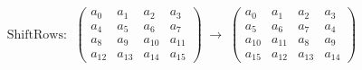\[
\text{ShiftRows: }\;
\begin{pmatrix}
a_0 & a_1 & a_2 & a_3 \\
a_4 & a_5 & a_6 & a_7 \\
a_8 & a_9 & a_{10} & a_{11} \\
a_{12} & a_{13} & a_{14} & a_{15}
\end{pmatrix}
\;\longrightarrow\;
\begin{pmatrix}
a_0 & a_1 & a_2 & a_3 \\
a_5 & a_6 & a_7 & a_4 \\
a_{10} & a_{11} & a_8 & a_9 \\
a_{15} & a_{12} & a_{13} & a_{14}
\end{pmatrix}
\]
